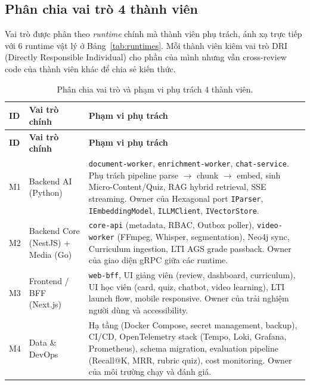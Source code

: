 \subsection{Phân chia vai trò 4 thành viên}
\label{subsec:roles-gd2}

Vai trò được phân theo \textit{runtime} chính mà thành viên phụ trách,
ánh xạ trực tiếp với 6 runtime vật lý ở Bảng~\ref{tab:runtimes}. Mỗi
thành viên kiêm vai trò DRI (Directly Responsible Individual) cho phần
của mình nhưng vẫn cross-review code của thành viên khác để chia sẻ
kiến thức.

\begin{longtable}{|p{1.2cm}|p{3.4cm}|p{9.5cm}|}
    \caption{Phân chia vai trò và phạm vi phụ trách 4 thành viên.}
    \label{tab:roles-gd2} \\
    \hline
    \textbf{ID} & \textbf{Vai trò chính} & \textbf{Phạm vi phụ trách} \\
    \hline
    \endfirsthead
    \hline
    \textbf{ID} & \textbf{Vai trò chính} & \textbf{Phạm vi phụ trách} \\
    \hline
    \endhead

    M1 & Backend AI (Python)
       & \texttt{document-worker}, \texttt{enrichment-worker},
         \texttt{chat-service}. Phụ trách pipeline parse $\to$ chunk
         $\to$ embed, sinh Micro-Content/Quiz, RAG hybrid retrieval, SSE
         streaming. Owner của Hexagonal port \texttt{IParser},
         \texttt{IEmbeddingModel}, \texttt{ILLMClient},
         \texttt{IVectorStore}. \\
    \hline
    M2 & Backend Core (NestJS) + Media (Go)
       & \texttt{core-api} (metadata, RBAC, Outbox poller),
         \texttt{video-worker} (FFmpeg, Whisper, segmentation), Neo4j
         sync, Curriculum ingestion, LTI AGS grade passback. Owner của
         giao diện gRPC giữa các runtime. \\
    \hline
    M3 & Frontend / BFF (Next.js)
       & \texttt{web-bff}, UI giảng viên (review, dashboard,
         curriculum), UI học viên (card, quiz, chatbot, video learning),
         LTI launch flow, mobile responsive. Owner của trải nghiệm
         người dùng và accessibility. \\
    \hline
    M4 & Data \& DevOps
       & Hạ tầng (Docker Compose, secret management, backup), CI/CD,
         OpenTelemetry stack (Tempo, Loki, Grafana, Prometheus), schema
         migration, evaluation pipeline (Recall@K, MRR, rubric quiz),
         cost monitoring. Owner của môi trường chạy và đánh giá. \\
    \hline
\end{longtable}

